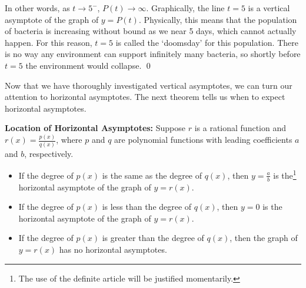 \begin{ex}
\begin{enumerate}
In other words, as $t \rightarrow 5^{-}$, $P(t) \rightarrow \infty$.  Graphically, the line $t=5$ is a vertical asymptote of the graph of $y=P(t)$.  Physically, this means that the population of bacteria is increasing without bound as we near 5 days, which cannot actually happen.  For this reason, $t=5$ is called the `doomsday' for this population. There is no way any environment can support infinitely many bacteria, so shortly before $t = 5$ the environment would collapse. \qed

\end{enumerate}

Now that we have thoroughly investigated vertical asymptotes, we can turn our attention to horizontal asymptotes.  The next theorem tells us when to expect horizontal asymptotes.

\smallskip
\colorbox{ResultColor}{\bbm

\begin{thm} \textbf{Location of Horizontal Asymptotes:}\label{hathm} Suppose $r$ is a rational function and $r(x) = \frac{p(x)}{q(x)}$, where $p$ and $q$ are polynomial functions with leading coefficients $a$ and $b$, respectively. 

\begin{itemize}

\item  If the degree of $p(x)$ is the same as the degree of $q(x)$, then $y=\frac{a}{b}$ is the\footnote{The use of the definite article will be justified momentarily.} horizontal asymptote of the graph of $y=r(x)$.

\item  If the degree of $p(x)$ is less than the degree of $q(x)$, then $y=0$ is the horizontal asymptote of the graph of $y=r(x)$.

\item  If the degree of $p(x)$ is greater than the degree of $q(x)$, then the graph of $y=r(x)$ has no horizontal asymptotes.


\end{itemize}
\end{thm}
\ebm}
\smallskip

\end{ex}


